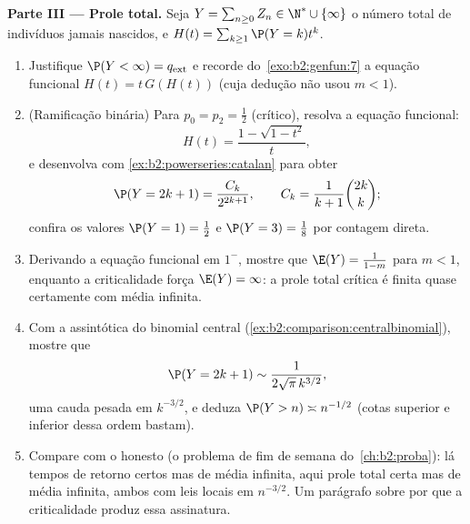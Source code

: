 \begin{problem}
\medskip
\noindent\textbf{Parte III --- Prole total.} Seja $Y =
\sum_{n\geq0}Z_n \in \N^* \cup \{\infty\}$ o número total
de indivíduos jamais nascidos, e $H(t) =
\sum_{k\geq1}\P(Y = k)t^k$.
\begin{enumerate}[resume]
  \item Justifique $\P(Y < \infty) = q_{\mathrm{ext}}$ e
        recorde do~\cref{exo:b2:genfun:7} a equação
        funcional $H(t) = t\,G(H(t))$ (cuja dedução não
        usou $m < 1$).
  \item (Ramificação binária) Para $p_0 = p_2 = \frac12$
        (crítico), resolva a equação funcional:
        \[
        H(t) = \frac{1 - \sqrt{1 - t^2}}{t},
        \]
        e desenvolva com \cref{ex:b2:powerseries:catalan} para
        obter
        \[
        \P(Y = 2k + 1) = \frac{C_k}{2^{2k+1}},
        \qquad C_k = \frac1{k+1}\binom{2k}k ;
        \]
        confira os valores $\P(Y = 1) = \frac12$ e $\P(Y = 3)
        = \frac18$ por contagem direta.
  \item Derivando a equação funcional em $1^-$,
        mostre que $\E(Y) = \frac{1}{1-m}$ para $m < 1$, enquanto a
        criticalidade força $\E(Y) = \infty$: a prole total
        crítica é finita quase certamente com média
        infinita.
  \item Com a assintótica do binomial central
        (\cref{ex:b2:comparison:centralbinomial}), mostre que
        \[
        \P(Y = 2k+1) \sim \frac{1}{2\sqrt\pi\,k^{3/2}},
        \]
        uma cauda pesada em $k^{-3/2}$, e deduza $\P(Y > n)
        \asymp n^{-1/2}$ (cotas superior e inferior dessa
        ordem bastam).
  \item Compare com o  honesto (o problema de fim
        de semana do~\cref{ch:b2:proba}): lá tempos de retorno certos mas
        de média infinita, aqui prole total certa mas
        de média infinita, ambos com leis locais em
        $n^{-3/2}$. Um parágrafo sobre por que a
        criticalidade produz essa assinatura.
\end{enumerate}


\end{problem}
